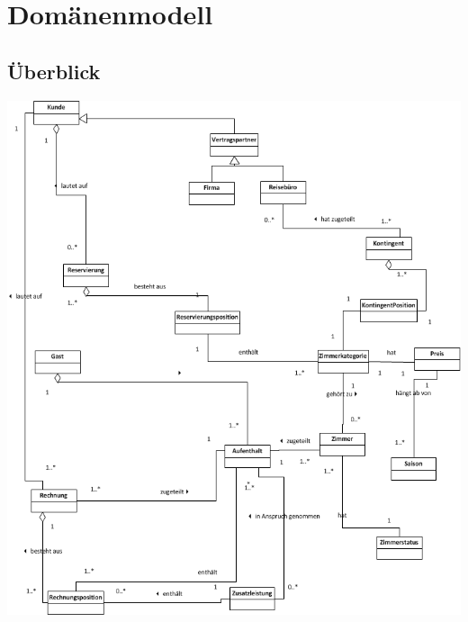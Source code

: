 \documentclass[10pt,a4paper,titlepage]{article}
\begin{document}
\newpage

\section{Domänenmodell}
\subsection{Überblick}
\includegraphics[width=\linewidth]{Images/Domaenenmodell_Uebersicht.png}
\end{document}
